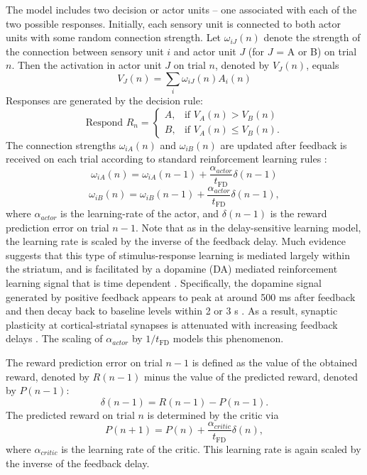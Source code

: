 \documentclass[doc, floatsintext]{apa7}
\begin{document}
The model includes two decision or actor units -- one
associated with each of the two possible responses.
Initially, each sensory unit is connected to both actor
units with some random connection strength. Let
$\omega_{iJ}(n)$ denote the strength of the connection
between sensory unit $i$ and actor unit $J$ (for $J$ = A or
B) on trial $n$. Then the activation in actor unit $J$ on
trial $n$, denoted by $V_J(n)$, equals
\begin{equation}
  V_J(n) = \sum_{i} \omega_{iJ}(n) A_i(n)
\end{equation}
Responses are generated by the decision rule:
\begin{equation}
 \text{Respond } R_n =
  \begin{cases}
    A, & \text{if $V_A(n) > V_B(n)$}\\
    B, & \text{if $V_A(n) \leq V_B(n).$}
  \end{cases}
\end{equation}
The connection strengths $\omega_{iA}(n)$ and
$\omega_{iB}(n)$ are updated after feedback is received on
each trial according to standard reinforcement learning
rules \parencite{SuttonBarto1998}:
\begin{equation}
  \omega_{iA}(n) = \omega_{iA}(n-1) + \frac{\alpha_{actor}}{t_\text{FD}} \delta(n-1)
\end{equation}
\begin{equation}
  \omega_{iB}(n) = \omega_{iB}(n-1) + \frac{\alpha_{actor}}{t_\text{FD}} \delta(n-1),
\end{equation}
where $\alpha_{actor}$ is the learning-rate of the actor, and
$\delta(n-1)$ is the reward prediction error on trial $n-1$.
Note that as in the delay-sensitive learning model, the
learning rate is scaled by the inverse of the feedback
delay. Much evidence suggests that this type of
stimulus-response learning is mediated largely within the
striatum, and is facilitated by a dopamine (DA) mediated
reinforcement learning signal that is time dependent
\parencite[e.g.,][]{ValentinMaddoxAshby2014}. Specifically,
the dopamine signal generated by positive feedback appears
to peak at around 500 ms after feedback and then decay back
to baseline levels within 2 or 3 s
\parencite{YagishitaEtAl2014}. As a result, synaptic
plasticity at cortical-striatal synapses is attenuated with
increasing feedback delays \parencite{YagishitaEtAl2014}.
The scaling of $\alpha_{actor}$ by $1/t_\text{FD}$ models this
phenomenon.

The reward prediction error on trial $n-1$ is defined as the
value of the obtained reward, denoted by $R(n-1)$ minus the
value of the predicted reward, denoted by $P(n-1)$:
\begin{equation}
  \delta(n-1) = R(n-1) - P(n-1).
\end{equation}
The predicted reward on trial $n$ is determined by the
critic via
\begin{equation}
  P(n+1) = P(n) + \frac{\alpha_{critic}}{t_\text{FD}} \delta(n),
\end{equation}
where $\alpha_{critic}$ is the learning rate of the critic.
This learning rate is again scaled by the inverse of the
feedback delay.
\end{document}
